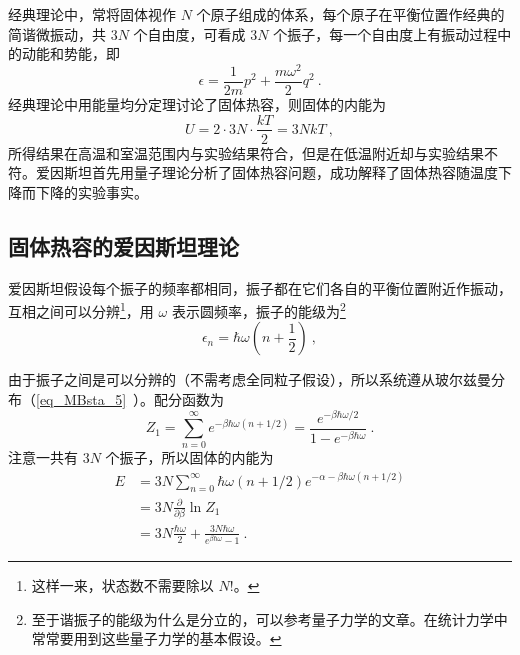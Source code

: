 

经典理论中，常将固体视作 $N$ 个原子组成的体系，每个原子在平衡位置作经典的简谐微振动，共 $3N$ 个自由度，可看成 $3N$ 个振子，每一个自由度上有振动过程中的动能和势能，即
\begin{equation}
\epsilon=\frac{1}{2m}p^2+\frac{m\omega^2}{2}q^2~.
\end{equation}
经典理论中用能量均分定理讨论了固体热容，则固体的内能为
\begin{equation}
U=2\cdot 3N\cdot \frac{kT}{2}=3NkT~,
\end{equation}
所得结果在高温和室温范围内与实验结果符合，但是在低温附近却与实验结果不符。爱因斯坦首先用量子理论分析了固体热容问题，成功解释了固体热容随温度下降而下降的实验事实。

\subsection{固体热容的爱因斯坦理论}
爱因斯坦假设每个振子的频率都相同，振子都在它们各自的平衡位置附近作振动，互相之间可以分辨\footnote{这样一来，状态数不需要除以 $N!$。}，用 $\omega$ 表示圆频率，振子的能级为\footnote{至于谐振子的能级为什么是分立的，可以参考量子力学的文章。在统计力学中常常要用到这些量子力学的基本假设。}
\begin{equation}
\epsilon_n=\hbar \omega\left(n+\frac{1}{2}\right)~,
\end{equation}

由于振子之间是可以分辨的（不需考虑全同粒子假设），所以系统遵从玻尔兹曼分布（\autoref{eq_MBsta_5}~）。配分函数为
\begin{equation}
Z_1=\sum_{n=0}^\infty e^{-\beta \hbar \omega(n+1/2)}=\frac{e^{-\beta\hbar \omega/2}}{1-e^{-\beta\hbar\omega}}~.
\end{equation}
注意一共有 $3N$ 个振子，所以固体的内能为
\begin{equation}\label{eq_EScap_1}
\begin{aligned}
E&=3N\sum_{n=0}^\infty \hbar\omega(n+1/2)e^{-\alpha-\beta\hbar\omega(n+1/2)}\\
&=3N\frac{\partial }{\partial \beta}\ln Z_1\\
&=3N\frac{\hbar \omega}{2}+\frac{3N\hbar \omega}{e^{\beta\hbar\omega}-1}~.
\end{aligned}
\end{equation}

